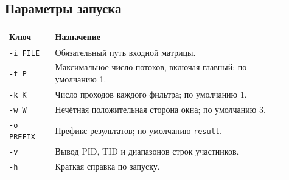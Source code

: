 \subsection{Параметры запуска}
\begin{longtable}{|p{0.15\linewidth}|p{0.76\linewidth}|}
\hline
Ключ & Назначение \\ \hline
\texttt{-i FILE} & Обязательный путь входной матрицы. \\ \hline
\texttt{-t P} & Максимальное число потоков, включая главный; по умолчанию 1. \\ \hline
\texttt{-k K} & Число проходов каждого фильтра; по умолчанию 1. \\ \hline
\texttt{-w W} & Нечётная положительная сторона окна; по умолчанию 3. \\ \hline
\texttt{-o PREFIX} & Префикс результатов; по умолчанию \texttt{result}. \\ \hline
\texttt{-v} & Вывод PID, TID и диапазонов строк участников. \\ \hline
\texttt{-h} & Краткая справка по запуску. \\ \hline
\end{longtable}
\clearpage
\endgroup
